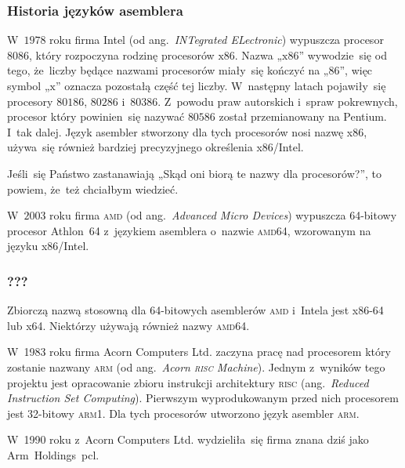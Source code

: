 \documentclass[10pt,t]{beamer}
\begin{document}
\begin{frame}
  \frametitle{Historia języków asemblera}


  W~$1978$ roku firma Intel (od ang.~\textit{INTegrated ELectronic})
  wypuszcza procesor $8086$, który rozpoczyna rodzinę procesorów
  $\text{x}86$. Nazwa „$\text{x}86$” wywodzie~się od tego, że~liczby
  będące nazwami procesorów miały~się kończyć na „$86$”, więc symbol
  „$\text{x}$” oznacza pozostałą część tej liczby. W~następny latach
  pojawiły~się procesory $80186$, $80286$ i~$80386$. Z~powodu praw
  autorskich i~spraw pokrewnych, procesor który powinien~się nazywać
  $80586$ został przemianowany na Pentium. I~tak dalej. Język asembler
  stworzony dla tych procesorów nosi nazwę \alert{x86}, używa~się również
  bardziej precyzyjnego określenia \alert{x86/Intel}.

  Jeśli~się Państwo zastanawiają „Skąd oni biorą te nazwy dla procesorów?”,
  to powiem, że~też chciałbym wiedzieć.

  W~$2003$ roku firma \textsc{amd} (od ang.~\textit{Advanced Micro Devices})
  wypuszcza 64-bitowy procesor Athlon~64 z~językiem asemblera o~nazwie
  \textsc{amd}64, wzorowanym na języku x86/Intel.

\end{frame}





\begin{frame}
  \frametitle{???}


  Zbiorczą nazwą stosowną dla 64-bitowych asemblerów \textsc{amd} i~Intela
  jest \alert{x86-64} lub \alert{x64}. Niektórzy używają również nazwy
  \alert{\textsc{amd}64}.

  W~1983 roku firma Acorn Computers Ltd. zaczyna pracę nad procesorem który
  zostanie nazwany \alert{\textsc{arm}} (od ang.~\textit{Acorn \textsc{risc}
    Machine}). Jednym z~wyników tego projektu jest opracowanie zbioru
  instrukcji architektury \textsc{risc} (ang.~\textit{Reduced Instruction
    Set Computing}). Pierwszym wyprodukowanym przed nich procesorem jest
  32-bitowy \textsc{arm1}. Dla tych procesorów utworzono język asembler
  \alert{\textsc{arm}}.

  W~1990 roku z~Acorn Computers Ltd. wydzieliła~się firma znana dziś jako
  Arm~Holdings~pcl.

\end{frame}
\end{document}
